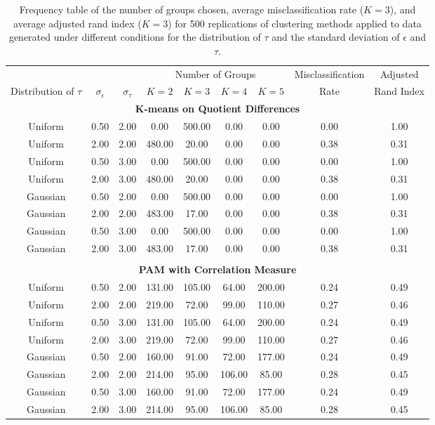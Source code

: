 \documentclass[12pt]{article}
\begin{document}
\begin{table}[ht]
\begin{center}
\begin{tabular}{ccc|cccccc}
  \hline &&&\multicolumn{4}{c}{Number of Groups}&Misclassification&Adjusted\\ Distribution of $\tau$&$\sigma_{\epsilon}$&$\sigma_{\tau}$&$K=2$&$K=3$&$K=4$&$K=5$&Rate&Rand Index\\ \hline\multicolumn{9}{c}{\textbf{K-means on Quotient Differences}}\\ Uniform & 0.50 & 2.00 & 0.00 & 500.00 & 0.00 & 0.00 & 0.00 & 1.00 \\ 
  Uniform & 2.00 & 2.00 & 480.00 & 20.00 & 0.00 & 0.00 & 0.38 & 0.31 \\ 
  Uniform & 0.50 & 3.00 & 0.00 & 500.00 & 0.00 & 0.00 & 0.00 & 1.00 \\ 
  Uniform & 2.00 & 3.00 & 480.00 & 20.00 & 0.00 & 0.00 & 0.38 & 0.31 \\ 
  Gaussian & 0.50 & 2.00 & 0.00 & 500.00 & 0.00 & 0.00 & 0.00 & 1.00 \\ 
  Gaussian & 2.00 & 2.00 & 483.00 & 17.00 & 0.00 & 0.00 & 0.38 & 0.31 \\ 
  Gaussian & 0.50 & 3.00 & 0.00 & 500.00 & 0.00 & 0.00 & 0.00 & 1.00 \\ 
  Gaussian & 2.00 & 3.00 & 483.00 & 17.00 & 0.00 & 0.00 & 0.38 & 0.31 \\ 
   \\ \multicolumn{9}{c}{\textbf{PAM with Correlation Measure}}\\Uniform & 0.50 & 2.00 & 131.00 & 105.00 & 64.00 & 200.00 & 0.24 & 0.49 \\ 
  Uniform & 2.00 & 2.00 & 219.00 & 72.00 & 99.00 & 110.00 & 0.27 & 0.46 \\ 
  Uniform & 0.50 & 3.00 & 131.00 & 105.00 & 64.00 & 200.00 & 0.24 & 0.49 \\ 
  Uniform & 2.00 & 3.00 & 219.00 & 72.00 & 99.00 & 110.00 & 0.27 & 0.46 \\ 
  Gaussian & 0.50 & 2.00 & 160.00 & 91.00 & 72.00 & 177.00 & 0.24 & 0.49 \\ 
  Gaussian & 2.00 & 2.00 & 214.00 & 95.00 & 106.00 & 85.00 & 0.28 & 0.45 \\ 
  Gaussian & 0.50 & 3.00 & 160.00 & 91.00 & 72.00 & 177.00 & 0.24 & 0.49 \\ 
  Gaussian & 2.00 & 3.00 & 214.00 & 95.00 & 106.00 & 85.00 & 0.28 & 0.45 \\ 
   \hline\end{tabular}
\caption{Frequency table of the number of groups chosen, average misclassification rate ($K=3$), and average adjusted rand index ($K=3$) for 500 replications of clustering methods applied to data generated under different conditions for the distribution of $\tau$ and the standard deviation of $\epsilon$ and $\tau$.}
\label{tab:freq2}
\end{center}
\end{table}
\end{document}
